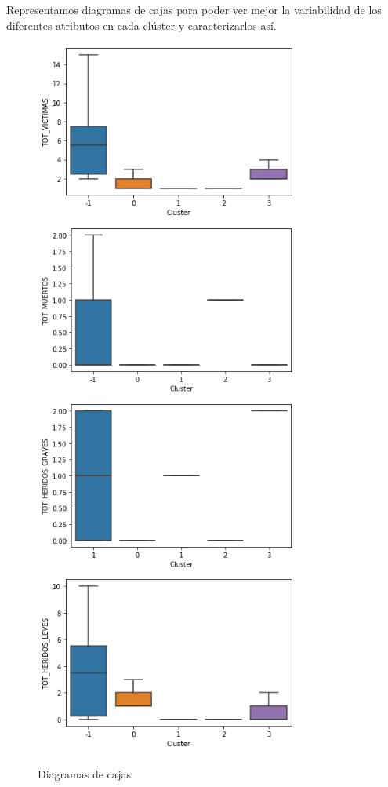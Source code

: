 \documentclass[a4]{article}
\begin{document}
Representamos diagramas de cajas para poder ver mejor la variabilidad de los diferentes atributos en cada clúster y caracterizarlos así.

\begin{figure}[H]
  \centering
  \caption{Diagramas de cajas}
  \includegraphics[width=87mm]{imagenes/c3_dbscan_vic}
  \includegraphics[width=87mm]{imagenes/c3_dbscan_muertos}
  \includegraphics[width=87mm]{imagenes/c3_dbscan_hg}
  \includegraphics[width=87mm]{imagenes/c3_dbscan_hl}

\end{figure}
\end{document}
